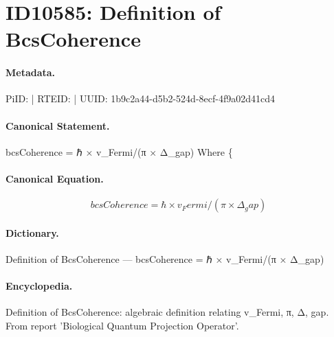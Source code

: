 \section*{ID10585: Definition of BcsCoherence}
\paragraph{Metadata.}
PiID:  | RTEID:  | UUID: 1b9c2a44-d5b2-524d-8ecf-4f9a02d41cd4

\paragraph{Canonical Statement.}
bcsCoherence = ℏ × v\_Fermi/(π × Δ\_gap) Where \{

\paragraph{Canonical Equation.}
\[
bcsCoherence = ℏ × v_Fermi/(π × Δ_gap)
\]

\paragraph{Dictionary.}
Definition of BcsCoherence — bcsCoherence = ℏ × v\_Fermi/(π × Δ\_gap)

\paragraph{Encyclopedia.}
Definition of BcsCoherence: algebraic definition relating v\_Fermi, π, Δ, gap. From report 'Biological Quantum Projection Operator'.
